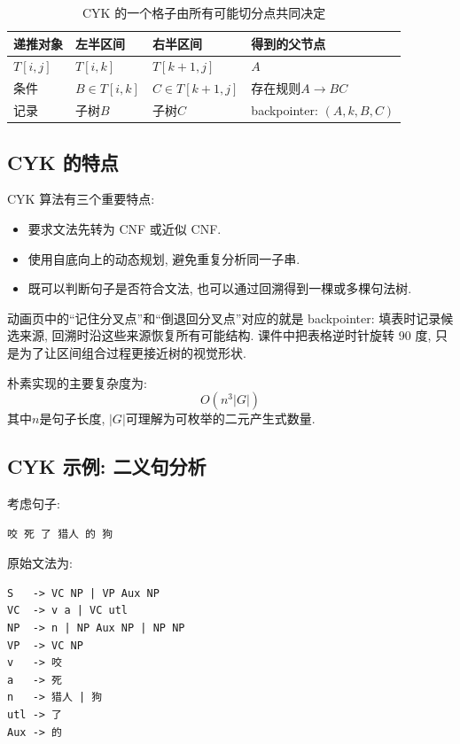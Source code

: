 \begin{table}[H]
\centering
\begingroup
\setlength{\tabcolsep}{2pt}
\small
\caption{CYK 的一个格子由所有可能切分点共同决定}
\begin{tabular}{|p{}|p{}|p{}|p{}|}
\hline
递推对象 & 左半区间 & 右半区间 & 得到的父节点 \\ \hline
$T[i,j]$ & $T[i,k]$ & $T[k+1,j]$ & $A$ \\ \hline
条件 & $B \in T[i,k]$ & $C \in T[k+1,j]$ & 存在规则$A \to B C$ \\ \hline
记录 & 子树$B$ & 子树$C$ & backpointer: $(A,k,B,C)$ \\ \hline
\end{tabular}
\endgroup
\end{table}

\subsection{CYK 的特点}


CYK 算法有三个重要特点:

\begin{itemize}
\item 要求文法先转为 CNF 或近似 CNF.
\item 使用自底向上的动态规划, 避免重复分析同一子串.
\item 既可以判断句子是否符合文法, 也可以通过回溯得到一棵或多棵句法树.
\end{itemize}

动画页中的“记住分叉点”和“倒退回分叉点”对应的就是 backpointer:
填表时记录候选来源, 回溯时沿这些来源恢复所有可能结构.
课件中把表格逆时针旋转 90 度, 只是为了让区间组合过程更接近树的视觉形状.

朴素实现的主要复杂度为:
\[
O(n^3 |G|)
\]
其中$n$是句子长度, $|G|$可理解为可枚举的二元产生式数量.

\subsection{CYK 示例: 二义句分析}


考虑句子:

\begin{Verbatim}[breaklines=true,breakanywhere=true,fontsize=\small]
咬 死 了 猎人 的 狗
\end{Verbatim}

原始文法为:

\begin{Verbatim}[breaklines=true,breakanywhere=true,fontsize=\small]
S   -> VC NP | VP Aux NP
VC  -> v a | VC utl
NP  -> n | NP Aux NP | NP NP
VP  -> VC NP
v   -> 咬
a   -> 死
n   -> 猎人 | 狗
utl -> 了
Aux -> 的
\end{Verbatim}

